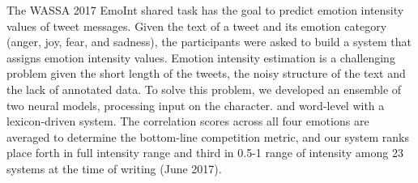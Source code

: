 The WASSA 2017 EmoInt shared task has the goal to predict emotion intensity values of tweet messages. Given the text of a tweet and its emotion category (anger, joy, fear, and sadness), the participants were asked to build a system that assigns emotion intensity values. Emotion intensity estimation is a challenging problem given the short length of the tweets, the noisy structure of the text and the lack of annotated data. To solve this problem, we developed an ensemble of two neural models, processing input on the character. and word-level with a lexicon-driven system. The correlation scores across all four emotions are averaged to determine the bottom-line competition metric, and our system ranks place forth in full intensity range and third in 0.5-1 range of intensity among 23 systems at the time of writing (June 2017).
